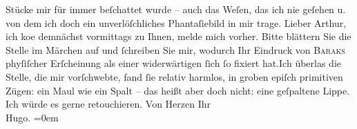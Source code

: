 \begin{ledgroupsized}[t]{13cm}
               Stücke {\pb}mir für immer beſchattet
               wurde – auch das Weſen, das ich
               nie geſehen u. von dem ich doch ein unverlöſchliches Phantaſiebild in mir trage.\pend
           \pstart
           Lieber Arthur, ich ko{\geminationm}e demnächst vormittags zu Ihnen,
               melde mich vorher.\pend
           \pstart
           Bitte blättern Sie die Stelle im Märchen auf und ſchreiben Sie mir, wodurch Ihr Eindruck von \textsc{Baraks} phyſiſcher {\pb}Erſcheinung als
               einer widerwärtigen ſich ſo fixiert hat.\hspace*{1.5em}Ich überlas
               die Stelle, die mir vorſchwebte, fand ſie relativ harmlos, in groben epiſch
               primitiven Zügen: ein Maul wie ein Spalt – das heißt aber doch nicht: eine geſpaltene
               Lippe.\pend
           \pstart
           Ich würde es gerne retouchieren.\pend
           \pstart
           Von Herzen Ihr{\\[\baselineskip]}\spacefill\mbox{Hugo.}\pend
           \leftskip=0em{}\endnumbering{}\end{ledgroupsized}  \newcommand{\dateiname}{L02334}\newcommand{\titel}{Hugo Hofmannsthal an Arthur Schnitzler, 23. 1. 1920}\newcommand{\editorInnen}{Martin Anton Müller und Gerd-Hermann Susen}
            \footnotesize
\begin{ledgroupsized}[t]{11.5cm}
\end{ledgroupsized}
         
      
